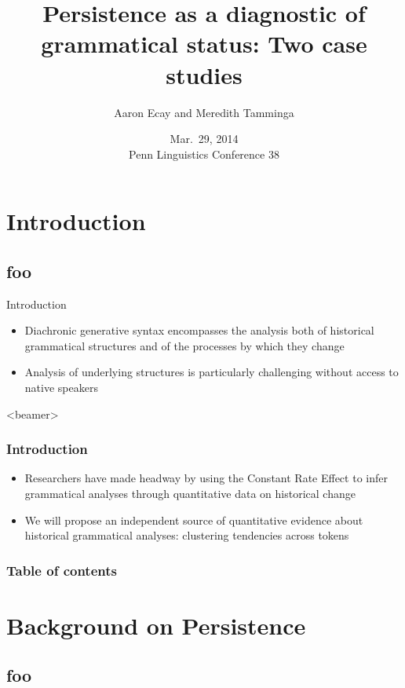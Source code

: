 \documentclass{digs-slides}
\title{Persistence as a diagnostic of grammatical status: Two case studies}
\author{Aaron Ecay and Meredith Tamminga}
\institute{University of Pennsylvania}
\date{Mar.\ 29, 2014 \\\vspace{0.5em} Penn Linguistics Conference 38}
\begin{document}
\begin{frame}
    \titlepage
\end{frame}

\section{Introduction}

\subsection*{foo}

\begin{frame}{Introduction}
    \begin{itemize}
      \item Diachronic generative syntax encompasses the analysis both
        of historical grammatical structures and of the processes by
        which they change
      \item Analysis of underlying structures is particularly challenging
        without access to native speakers
    \end{itemize}
\end{frame}

\begin{frame}<beamer>
    \frametitle{Introduction}
    \begin{itemize}
      \item Researchers have made headway by using the Constant Rate
        Effect \parencite{Kroch1989} to infer grammatical
        analyses through quantitative data on historical change
      \item We will propose an independent source of quantitative
        evidence about historical grammatical analyses: clustering
        tendencies across tokens
    \end{itemize}
\end{frame}

\begin{frame}
    \frametitle{Table of contents}
    \tableofcontents{}
\end{frame}

\section{Background on Persistence}

\subsection*{foo}
\end{document}
